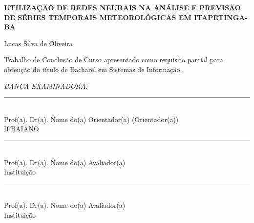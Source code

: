 \documentclass[12pt, openright, a4paper, brazil, oneside]{abntex2}
\begin{document}
    \newpage
    \begin{center}
        \begin{center}
            \ABNTEXchapterfont\bfseries\LARGE UTILIZAÇÃO DE REDES NEURAIS NA ANÁLISE E PREVISÃO DE SÉRIES TEMPORAIS METEOROLÓGICAS EM ITAPETINGA-BA
        \end{center}

        \vspace{3cm}

        \begin{center}
            {\ABNTEXchapterfont\large Lucas Silva de Oliveira}
        \end{center}

        \vspace{4cm}
    
        \begin{flushright}
            \begin{minipage}{8.6cm}
                Trabalho de Conclusão de Curso apresentado como 
                requisito parcial para obtenção 
                do título de Bacharel em Sistemas de Informação.
            \end{minipage}
        \end{flushright}
        

        \vspace{1cm}
        
        \begin{center}

            \textit{BANCA EXAMINADORA:}
            \vspace{2cm}

            \begin{minipage}{12cm}
                \begin{center}
                    \rule{10.5cm}{0.5pt} \\ %
                    Prof(a). Dr(a). Nome do(a) Orientador(a) (Orientador(a)) \\ IFBAIANO \\
                    \vspace{0.5cm}
                    \rule{10.5cm}{0.5pt} \\ %
                    Prof(a). Dr(a). Nome do(a) Avaliador(a) \\ Instituição \\
                    \vspace{0.5cm}
                    \rule{10.5cm}{0.5pt} \\ %
                    Prof(a). Dr(a). Nome do(a) Avaliador(a) \\ Instituição
                \end{center}
            \end{minipage}
        \end{center}
    \end{center}
\end{document}
